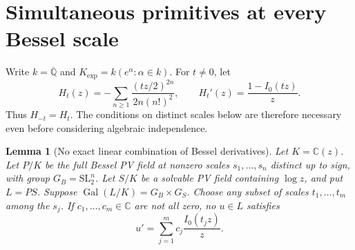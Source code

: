 \documentclass[11pt]{article}
\newtheorem{lemma}[theorem]{Lemma}
\theoremstyle{definition}
\theoremstyle{remark}
\begin{document}
\section{Simultaneous primitives at every Bessel scale}
\label{sec:msprim}
Write $k=\overline{\mathbb Q}$ and
$K_{\exp}=k(e^\alpha:\alpha\in k)$. For $t\ne0$, let
\begin{equation}\label{msprim:H}
 H_t(z)=-\sum_{n\ge1}\frac{(tz/2)^{2n}}{2n(n!)^2},
 \qquad H_t'(z)=\frac{1-I_0(tz)}z.
\end{equation}
Thus $H_{-t}=H_t$. The conditions on distinct scales below are
therefore necessary even before considering algebraic independence.

\begin{lemma}[No exact linear combination of Bessel derivatives]
\label{msprim:nonexact}
Let $K=\mathbb C(z)$. Let $P/K$ be the full Bessel PV field at
nonzero scales $s_1,\ldots,s_n$ distinct up to sign, with group
$G_B=\mathrm{SL}_2^n$. Let $S/K$ be a solvable PV field containing
$\log z$, and put $L=PS$. Suppose
$\operatorname{Gal}(L/K)=G_B\times G_S$.
Choose any subset of scales $t_1,\ldots,t_m$ among the $s_j$.
If $c_1,\ldots,c_m\in\mathbb C$ are not all zero, no $u\in L$
satisfies
\begin{equation}\label{msprim:derivative}
 u'=\sum_{j=1}^m c_j\frac{I_0(t_jz)}z.
\end{equation}
\end{lemma}
\end{document}
